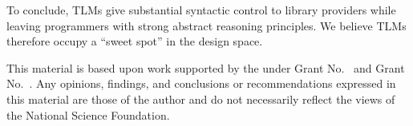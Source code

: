 \documentclass[acmsmall,10pt,review,anonymous]{acmart}\settopmatter{printfolios=true}
\begin{document}
To conclude, TLMs give substantial syntactic control to library providers while leaving programmers with strong abstract reasoning principles. We believe TLMs therefore occupy a ``sweet spot'' in the  design space. %





\begin{acks}                            %
  This material is based upon work supported by the
   under Grant
  No.~ and Grant
  No.~.  Any opinions, findings, and
  conclusions or recommendations expressed in this material are those
  of the author and do not necessarily reflect the views of the
  National Science Foundation.
\end{acks}



\end{document}
